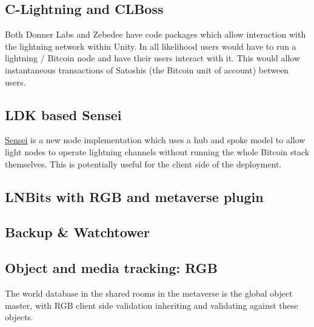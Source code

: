 \subsection{C-Lightning and CLBoss}
Both Donner Labs and Zebedee have code packages which allow interaction with the lightning network within Unity. In all likelihood users would have to run a lightning / Bitcoin node and have their users interact with it. This would allow instantaneous transactions of Satoshis (the Bitcoin unit of account) between users. 
\subsection{LDK based Sensei}
\href{https://l2.technology/sensei}{Sensei} is a new node implementation which uses a hub and spoke model to allow light nodes to operate lightning channels without running the whole Bitcoin stack themselves. This is potentially useful for the client side of the deployment.

\subsection{LNBits with RGB and metaverse plugin}
\subsection{Backup \& Watchtower}
\subsection{Object and media tracking: RGB}
The world database in the shared rooms in the metaverse is the global object master, with RGB client side validation inheriting and validating against these objects.\par

